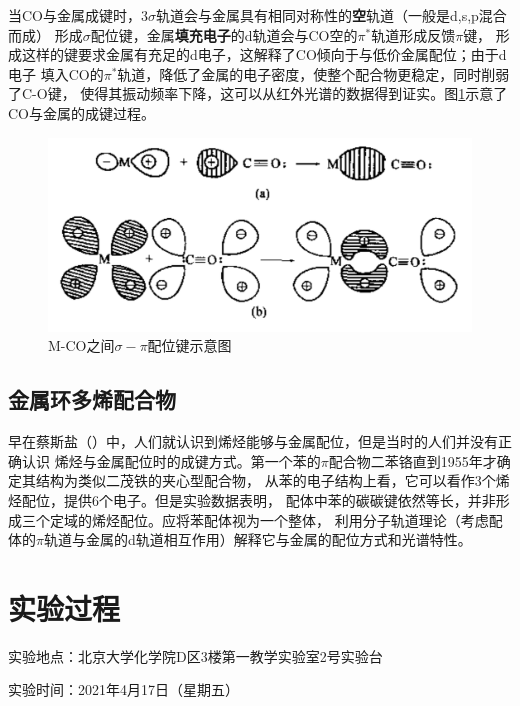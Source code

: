 \documentclass[a4paper,zihao=5,UTF8]{ctexart}
\begin{document}
	当CO与金属成键时，$3\sigma$轨道会与金属具有相同对称性的\textbf{空}轨道（一般是d,s,p混合而成）
	形成$\sigma$配位键，金属\textbf{填充电子}的d轨道会与CO空的$\pi^*$轨道形成反馈$\pi$键，
	形成这样的键要求金属有充足的d电子，这解释了CO倾向于与低价金属配位；由于d电子
	填入CO的$\pi^*$轨道，降低了金属的电子密度，使整个配合物更稳定，同时削弱了C-O键，
	使得其振动频率下降，这可以从红外光谱的数据得到证实。图\ref{M-CO}示意了CO与金属的成键过程。
	\begin{figure}
		\centering 
		\includegraphics[scale=0.25]{M_CO.png}
		\caption{M-CO之间$\sigma-\pi$配位键示意图\cite{comprehensive_inorganic_chemistry}}
		\label{M-CO}
	\end{figure}
	\subsection{金属环多烯配合物}
	早在蔡斯盐（）中，人们就认识到烯烃能够与金属配位，但是当时的人们并没有正确认识
	烯烃与金属配位时的成键方式。第一个苯的$\pi$配合物二苯铬直到1955年才确定其结构为类似二茂铁的夹心型配合物，
	从苯的电子结构上看，它可以看作3个烯烃配位，提供6个电子。但是实验数据表明，
	配体中苯的碳碳键依然等长，并非形成三个定域的烯烃配位。应将苯配体视为一个整体，
	利用分子轨道理论（考虑配体的$\pi$轨道与金属的d轨道相互作用）解释它与金属的配位方式和光谱特性。
    \section{实验过程}
    实验地点：北京大学化学院D区3楼第一教学实验室2号实验台
	\par 
	实验时间：2021年4月17日（星期五）
\end{document}
